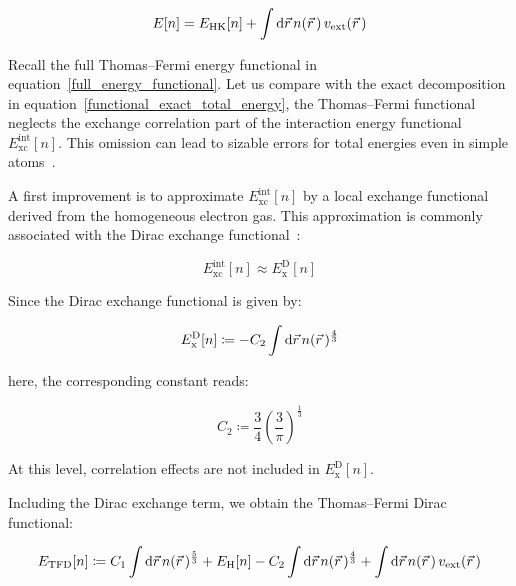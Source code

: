 \begin{equation}
    E[n]=E_\mathrm{HK}[n]+\int\mathrm{d}{\vec{r}}\,n(\vec{r}\,)\,v_\mathrm{ext}(\vec{r}\,)
\label{functional_exact_total_energy_HK_form}
\end{equation}

Recall the full Thomas--Fermi energy functional in equation~\eqref{full_energy_functional}.
Let us compare with the exact decomposition in equation~\eqref{functional_exact_total_energy},
the Thomas--Fermi functional neglects the exchange correlation part of the interaction energy functional $E_\mathrm{xc}^\mathrm{int}[n]$.
This omission can lead to sizable errors for total energies even in simple atoms~\cite{schwinger1980thomas, schwinger1981thomas}.

A first improvement is to approximate $E_\mathrm{xc}^\mathrm{int}[n]$ by a local exchange functional derived from the homogeneous electron gas.
This approximation is commonly associated with the Dirac exchange functional~\cite{dirac1930note}:

\begin{equation}
    E_\mathrm{xc}^\mathrm{int}[n]\approx E_\mathrm{x}^\mathrm{D}[n]
\label{Dirac_exchange_approximation}
\end{equation}

Since the Dirac exchange functional is given by:

\begin{equation}
    E_\mathrm{x}^\mathrm{D}[n]\coloneqq -C_2\int\mathrm{d}{\vec{r}}\,n(\vec{r}\,)^{\frac{4}{3}}
\label{Dirac_exchange_functional}
\end{equation}

here, the corresponding constant reads:

\begin{equation}
    C_2 \coloneqq \frac{3}{4}\left(\frac{3}{\pi}\right)^{\frac{1}{3}}
\label{Dirac_exchange_constant}
\end{equation}

At this level, correlation effects are not included in $E_\mathrm{x}^\mathrm{D}[n]$.

Including the Dirac exchange term, we obtain the Thomas--Fermi Dirac functional:

\begin{equation}
    E_\mathrm{TFD}[n]
    \coloneqq C_1\int\mathrm{d}{\vec{r}}\,n(\vec{r}\,)^{\frac{5}{3}}
    + E_\mathrm{H}[n]
    - C_2\int\mathrm{d}{\vec{r}}\,n(\vec{r}\,)^{\frac{4}{3}}
    + \int\mathrm{d}{\vec{r}}\,n(\vec{r}\,)\,v_\mathrm{ext}(\vec{r}\,)
\label{TFD_functional}
\end{equation}

